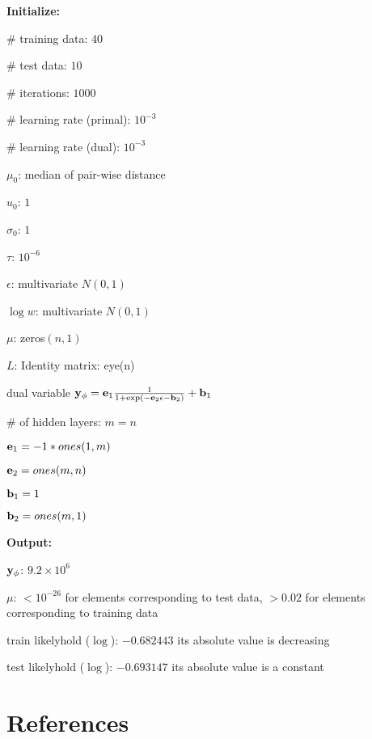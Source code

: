 \documentclass{article}
\def\e{{\bf e}}
\def\b{{\bf b}}
\def\y{{\bf y}}
\begin{document}
\textbf{Initialize:}

\# training data: $40$

\# test data: $10$

\# iterations: $1000$

\# learning rate (primal): $10^{-3}$

\# learning rate (dual): $10^{-3}$

$\mu_0$: median of pair-wise distance

$u_0$: $1$

$\sigma_0$: $1$

$\tau$: $10^{-6}$

$\epsilon$: multivariate $N(0,1)$

$\log w$: multivariate $N(0,1)$

$\mu$: zeros$(n,1)$

$L$: Identity matrix: eye(n)

dual variable $\y_{\phi} = \e_1 \frac{1}{1+\exp(-\e_2\epsilon-\b_2)} + \b_1$

\# of hidden layers: $m=n$

$\e_1 = -1*ones(1,m)$

$\e_2 = ones(m,n)$

$\b_1 = 1$

$\b_2 = ones(m,1)$


\textbf{Output:}

$\y_{\phi}$: $9.2\times 10^{6}$

$\mu$: $<10^{-26}$ for elements corresponding to test data, $>0.02$ for elements corresponding to training data

train likelyhold ($\log$): $-0.682443$ its absolute value is decreasing

test likelyhold ($\log$): $-0.693147$ its absolute value is a constant















\section*{References}



\end{document}
